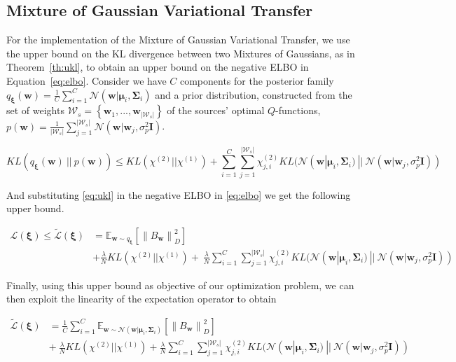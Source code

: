 \documentclass{article}
\newcommand{\norm}[1]{\left\lVert #1 \right\rVert}
\newcommand{\abs}[1]{\left\lvert #1 \right\rvert}
\begin{document}
\subsection{Mixture of Gaussian Variational Transfer}

For the implementation of the Mixture of Gaussian Variational Transfer, we use the upper bound on the KL divergence between two Mixtures of Gaussians, as in Theorem~\ref{th:ukl}, to obtain an upper bound on the negative ELBO in Equation~\eqref{eq:elbo}. Consider we have $C$ components for the posterior family $q_{\bm{\xi}}(\bm{w}) = \frac{1}{C}\sum_{i=1}^C\mathcal{N}(\bm{w}|\bm{\mu}_i,\bm{\Sigma}_i)$ and a prior distribution, constructed from the set of weights $\mathcal{W}_s = \left\lbrace \bm{w}_1,..., \bm{w}_{|\mathcal{W}_s|} \right\rbrace$ of the sources' optimal $Q$-functions, $p(\bm{w}) = \frac{1}{\abs{\mathcal{W}_s}}\sum_{j=1}^{|\mathcal{W}_s|}\mathcal{N}(\bm{w}|\bm{w}_j,\sigma_p^2\bm{I})$.

\begin{equation}\label{eq:ukl}
KL\left(q_{\bm{\xi}}(\bm{w})\ ||\ p(\bm{w})\right) \leq KL(\chi^{(2)}||\chi^{(1)}) + \sum_{i=1}^C\sum_{j=1}^{|\mathcal{W}_s|} \chi_{j,i}^{(2)}KL(\mathcal{N}(\bm{w}|\bm{\mu}_i, \bm{\Sigma}_i)\ ||\ \mathcal{N}(\bm{w}|\bm{w}_j, \sigma_p^2\bm{I}))
\end{equation}

And substituting \eqref{eq:ukl} in the negative ELBO in \eqref{eq:elbo} we get the following upper bound.

\begin{align}
\mathcal{L}(\bm{\xi}) \leq  \widetilde{\mathcal{L}}(\bm{\xi}) &= \mathbb{E}_{\bm{w} \sim q_{\bm{\xi}}}\left[\norm{B_{\bm{w}}}_D^2\right] \nonumber \\&+ \frac{\lambda}{N} KL(\chi^{(2)}||\chi^{(1)}) +\  \frac{\lambda}{N}\sum_{i=1}^C\sum_{j=1}^{|\mathcal{W}_s|} \chi_{j,i}^{(2)}KL(\mathcal{N}(\bm{w}|\bm{\mu}_i, \bm{\Sigma}_i)\ ||\ \mathcal{N}(\bm{w}|\bm{w}_j, \sigma_p^2\bm{I}))
\end{align}

Finally, using this upper bound as objective of our optimization problem, we can then exploit the linearity of the expectation operator to obtain


\begin{align}
\widetilde{\mathcal{L}}(\bm{\xi}) &= \frac{1}{C}\sum_{i=1}^C \mathbb{E}_{\bm{w} \sim \mathcal{N}(\bm{w}|\bm{\mu}_i, \bm{\Sigma}_i)}\left[\norm{B_{\bm{w}}}_D^2\right] \nonumber \\ &+\ \frac{\lambda}{N}KL(\chi^{(2)}||\chi^{(1)}) + \frac{\lambda}{N}\sum_{i=1}^C\sum_{j=1}^{|\mathcal{W}_s|} \chi_{j,i}^{(2)} KL(\mathcal{N}(\bm{w}|\bm{\mu}_i, \bm{\Sigma}_i)\ ||\ \mathcal{N}(\bm{w}|\bm{w}_j, \sigma_p^2\bm{I}))
\end{align}
\end{document}
